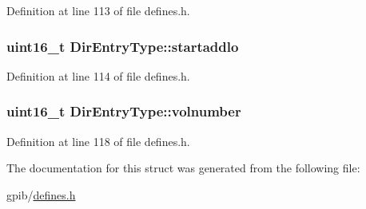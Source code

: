Definition at line 113 of file defines.\+h.

\subsubsection[{\texorpdfstring{startaddlo}{startaddlo}}]{\setlength{\rightskip}{0pt plus 5cm}uint16\+\_\+t Dir\+Entry\+Type\+::startaddlo}\hypertarget{structDirEntryType_aea0e798bb172b4bddf174ce339a4a54a}{}\label{structDirEntryType_aea0e798bb172b4bddf174ce339a4a54a}


Definition at line 114 of file defines.\+h.

\subsubsection[{\texorpdfstring{volnumber}{volnumber}}]{\setlength{\rightskip}{0pt plus 5cm}uint16\+\_\+t Dir\+Entry\+Type\+::volnumber}\hypertarget{structDirEntryType_add9ab11f89586efb100471f6580e75c5}{}\label{structDirEntryType_add9ab11f89586efb100471f6580e75c5}


Definition at line 118 of file defines.\+h.



The documentation for this struct was generated from the following file\+:\begin{DoxyCompactItemize}
\item 
gpib/\hyperlink{defines_8h}{defines.\+h}\end{DoxyCompactItemize}
